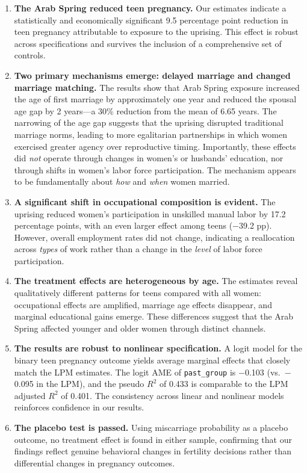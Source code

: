 \documentclass[12pt,a4paper]{article}
\begin{document}
\begin{enumerate}
    \item \textbf{The Arab Spring reduced teen pregnancy.} Our estimates indicate a statistically and economically significant 9.5 percentage point reduction in teen pregnancy attributable to exposure to the uprising. This effect is robust across specifications and survives the inclusion of a comprehensive set of controls.

    \item \textbf{Two primary mechanisms emerge: delayed marriage and changed marriage matching.} The results show that Arab Spring exposure increased the age of first marriage by approximately one year and reduced the spousal age gap by 2 years---a 30\% reduction from the mean of 6.65 years. The narrowing of the age gap suggests that the uprising disrupted traditional marriage norms, leading to more egalitarian partnerships in which women exercised greater agency over reproductive timing. Importantly, these effects did \textit{not} operate through changes in women's or husbands' education, nor through shifts in women's labor force participation. The mechanism appears to be fundamentally about \textit{how} and \textit{when} women married.

    \item \textbf{A significant shift in occupational composition is evident.} The uprising reduced women's participation in unskilled manual labor by 17.2 percentage points, with an even larger effect among teens ($-$39.2 pp). However, overall employment rates did not change, indicating a reallocation across \textit{types} of work rather than a change in the \textit{level} of labor force participation.

    \item \textbf{The treatment effects are heterogeneous by age.} The estimates reveal qualitatively different patterns for teens compared with all women: occupational effects are amplified, marriage age effects disappear, and marginal educational gains emerge. These differences suggest that the Arab Spring affected younger and older women through distinct channels.

    \item \textbf{The results are robust to nonlinear specification.} A logit model for the binary teen pregnancy outcome yields average marginal effects that closely match the LPM estimates. The logit AME of \texttt{past\_group} is $-$0.103 (vs.\ $-$0.095 in the LPM), and the pseudo $R^2$ of 0.433 is comparable to the LPM adjusted $R^2$ of 0.401. The consistency across linear and nonlinear models reinforces confidence in our results.

    \item \textbf{The placebo test is passed.} Using miscarriage probability as a placebo outcome, no treatment effect is found in either sample, confirming that our findings reflect genuine behavioral changes in fertility decisions rather than differential changes in pregnancy outcomes.
\end{enumerate}
\end{document}
